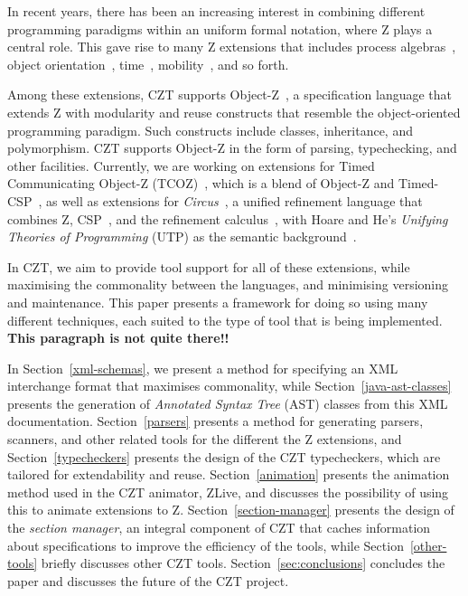 \documentclass{llncs}
\newcommand{\Circus}{{\sf\slshape Circus}}
\begin{document}
  In recent years, there has been an increasing interest in combining
  different programming paradigms within an uniform formal notation,
  where Z plays a central role. This gave rise to many Z extensions that
  includes process algebras~\cite{fischer-1998,fischer-2000,circus.sem:intro},
  object orientation~\cite{oz,ohcircus}, time~\cite{tcoz,circus.sem:real.time2},
  mobility~\cite{circus.sem:mobility}, and so forth.

  Among these extensions, CZT supports Object-Z~\cite{oz}, a
  specification language that extends Z with modularity and reuse
  constructs that resemble the object-oriented programming
  paradigm. Such constructs include classes, inheritance, and
  polymorphism. CZT supports Object-Z in the form of parsing,
  typechecking, and other facilities.  Currently, we are working on
  extensions for Timed Communicating Object-Z (TCOZ)~\cite{tcoz},
  which is a blend of Object-Z and Timed-CSP~\cite{timed-csp}, as well
  as extensions for \Circus~\cite{circus.sem:intro}, a unified
  refinement language that combines Z, CSP~\cite{csp.books:roscoe},
  and the refinement calculus~\cite{fm.ref:morgan}, with Hoare and
  He's \textit{Unifying Theories of Programming} (UTP) as the semantic
  background~\cite{hoare.utp}.

  In CZT, we aim to provide tool support for all of these extensions,
  while maximising the commonality between the languages, and
  minimising versioning and maintenance. This paper presents a
  framework for doing so using many different techniques, each suited
  to the type of tool that is being implemented. {\bf This paragraph is
  not quite there!!}

  In Section~\ref{xml-schemas}, we present a method for specifying an
  XML interchange format that maximises commonality, while
  Section~\ref{java-ast-classes} presents the generation of
  \emph{Annotated Syntax Tree} (AST) classes from this XML
  documentation. Section~\ref{parsers} presents a method for
  generating parsers, scanners, and other related tools for the
  different the Z extensions, and Section~\ref{typecheckers} presents
  the design of the CZT typecheckers, which are tailored for
  extendability and reuse. Section~\ref{animation} presents the
  animation method used in the CZT animator, ZLive, and discusses the
  possibility of using this to animate extensions to
  Z. Section~\ref{section-manager} presents the design of the {\em
  section manager}, an integral component of CZT that caches
  information about specifications to improve the efficiency of the
  tools, while Section~\ref{other-tools} briefly discusses other CZT
  tools. Section~\ref{sec:conclusions} concludes the paper and
  discusses the future of the CZT project.
\end{document}

